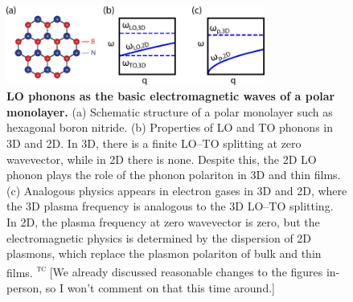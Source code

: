 \documentclass[aps,prb,twocolumn,
	           groupedaddress,superscriptaddress,
               amsfonts,amssymb,amsmath,floatfix,
	           citeautoscript]{revtex4-1}
\newcommand{\comment}[2]{%
    \ifbool{togglecomments}%
    {\textcolor{blue!70!black}{\small\textsf{%
    \textsuperscript{\textsc{\textsf{\MakeLowercase{#1}}}}%
    [#2]}}} %
    {}}     %
\begin{document}
\begin{figure}[t]
    \includegraphics[width=85mm]{fig1.pdf}
    \caption{%
        \textbf{LO phonons as the basic electromagnetic waves of a polar monolayer.} (a) Schematic structure of a polar monolayer such as hexagonal boron nitride. (b) Properties of LO and TO phonons in 3D and 2D. In 3D, there is a finite LO--TO splitting at zero wavevector, while in 2D there is none. Despite this, the 2D LO phonon plays the role of the phonon polariton in 3D and thin films. (c) Analogous physics appears in electron gases in 3D and 2D, where the 3D plasma frequency is analogous to the 3D LO--TO splitting. In 2D, the plasma frequency at zero wavevector is zero, but the electromagnetic physics is determined by the dispersion of 2D plasmons, which replace the plasmon polariton of bulk and thin films.
        \comment{tc}{We already discussed reasonable changes to the figures in-person, so I won't comment on that this time around.}
        \label{fig:1}
        }
\end{figure}~
\end{document}
